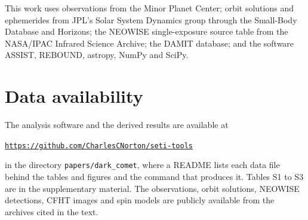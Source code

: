 \documentclass[3p,11pt]{elsarticle}
\begin{document}
This work uses observations from the Minor Planet Center; orbit solutions and ephemerides
from JPL's Solar System Dynamics group through the Small-Body Database and Horizons; the
NEOWISE single-exposure source table from the NASA/IPAC Infrared Science Archive; the
DAMIT database; and the software ASSIST, REBOUND, astropy, NumPy and SciPy.

\section*{Data availability}

The analysis software and the derived results are available at
\begin{center}
\href{https://github.com/CharlesCNorton/seti-tools/tree/main/papers/dark_comet}{\nolinkurl{https://github.com/CharlesCNorton/seti-tools}}
\end{center}
\noindent in the directory \texttt{papers/dark\_comet}, where a README lists each data file
behind the tables and figures and the command that produces it. Tables S1 to S3 are in the supplementary material. The observations,
orbit solutions, NEOWISE detections, CFHT images and spin models are publicly available
from the archives cited in the text.
\end{document}
